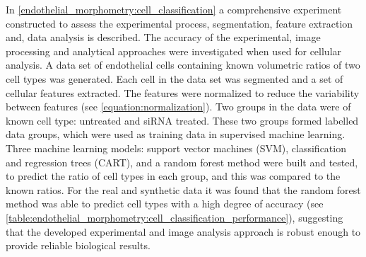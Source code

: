 In \autoref{endothelial_morphometry:cell_classification} a comprehensive experiment constructed to assess the experimental process, segmentation, feature extraction and, data analysis is described. The accuracy of the experimental, image processing and analytical approaches were investigated when used for cellular analysis. A data set of endothelial cells containing known volumetric ratios of two cell types was generated. Each cell in the data set was segmented and a set of cellular features extracted. The features were normalized to reduce the variability between features (see \autoref{equation:normalization}). Two groups in the data were of known cell type: untreated and siRNA treated. These two groups formed labelled data groups, which were used as training data in supervised machine learning. Three machine learning models: support vector machines (SVM), classification and regression trees (CART), and a random forest method were built and tested, to predict the ratio of cell types in each group, and this was compared to the known ratios. For the real and synthetic data it was found that the random forest method was able to predict cell types with a high degree of accuracy (see \autoref{table:endothelial_morphometry:cell_classification_performance}), suggesting that the developed experimental and image analysis approach is robust enough to provide reliable biological results.
